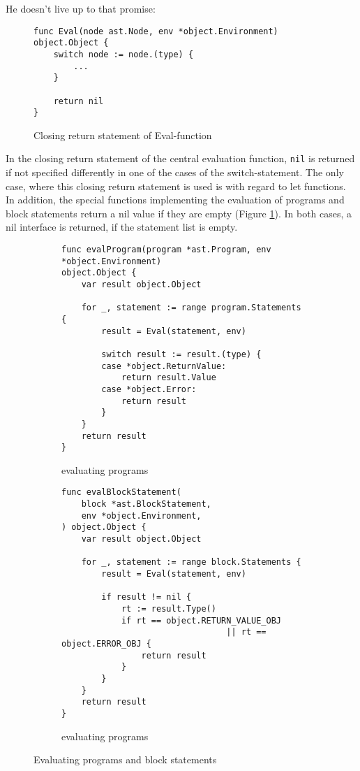 \documentclass[a4paper,10pt]{article}
\begin{document}
He doesn't live up to that promise:

\begin{figure}[h]
\begin{tcolorbox}\small
\begin{verbatim}
func Eval(node ast.Node, env *object.Environment) object.Object {
    switch node := node.(type) {
	    ...
    }

    return nil
}
\end{verbatim}
\end{tcolorbox}
\caption{Closing return statement of Eval-function}
\end{figure}

In the closing return statement of the central evaluation function,
{\tt nil} is returned if not specified differently in one of the cases of the switch-statement.
The only case, where this closing return statement is used is with regard to let functions. 
In addition, the special functions implementing the evaluation of programs and block statements return a nil value if they are empty (Figure \ref{evalstmts}). In both cases, a nil interface is returned, if the statement list is empty.


\begin{figure}[h]
\begin{subfigure}{\textwidth}
\begin{tcolorbox}\small
\begin{verbatim}
func evalProgram(program *ast.Program, env *object.Environment) 
object.Object {
    var result object.Object

    for _, statement := range program.Statements {
        result = Eval(statement, env)

        switch result := result.(type) {
        case *object.ReturnValue:
            return result.Value
        case *object.Error:
            return result
        }
    }
    return result
}
\end{verbatim}
\end{tcolorbox} 
\caption{evaluating programs}
\end{subfigure}

\begin{subfigure}{\textwidth}

\begin{tcolorbox}\small
\begin{verbatim}
func evalBlockStatement(
    block *ast.BlockStatement,
    env *object.Environment,
) object.Object {
    var result object.Object

    for _, statement := range block.Statements {
        result = Eval(statement, env)

        if result != nil {
            rt := result.Type()
            if rt == object.RETURN_VALUE_OBJ 
                                 || rt == object.ERROR_OBJ {
                return result
            }
        }
    }
    return result
}

\end{verbatim}
\end{tcolorbox}
\caption{evaluating programs}
\end{subfigure}
\caption{Evaluating programs and block statements}
\label{evalstmts}
\end{figure}
\end{document}
